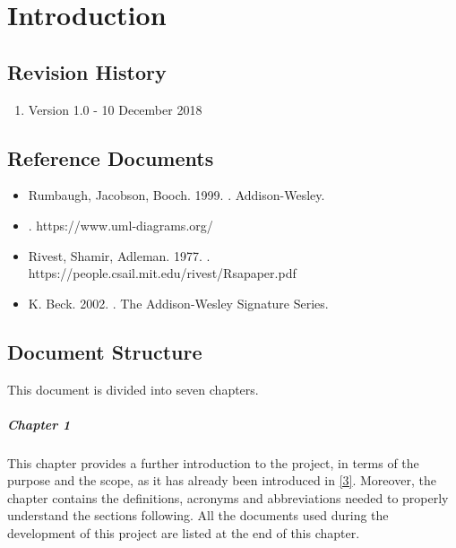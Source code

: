 \documentclass[../DD.tex]{subfiles}
\begin{document}
\chapter{Introduction}
\thispagestyle{fancy}
		
		
		
		
		
		\section{Revision History}
		\begin{enumerate}
			\item Version 1.0 - 10 December 2018
		\end{enumerate}
		
		\section{Reference Documents\label{sect:1.5}}
			\begin{itemize}
				\item Rumbaugh, Jacobson, Booch. 1999. . Addison-Wesley.
				\item {}. https://www.uml-diagrams.org/
				\item Rivest, Shamir, Adleman. 1977. . \\https://people.csail.mit.edu/rivest/Rsapaper.pdf
				\item K. Beck. 2002. . The Addison-Wesley Signature Series.
			\end{itemize}
			
		\section{Document Structure}
		This document is divided into seven chapters.
		
		\paragraph{Chapter 1}
			This chapter provides a further introduction to the project, in terms of the purpose and the scope, as it has already been introduced in \hyperref[ref:3]{[3]}. Moreover, the chapter contains the definitions, acronyms and abbreviations needed to properly understand the sections following. All the documents used during the development of this project are listed at the end of this chapter.
\end{document}

